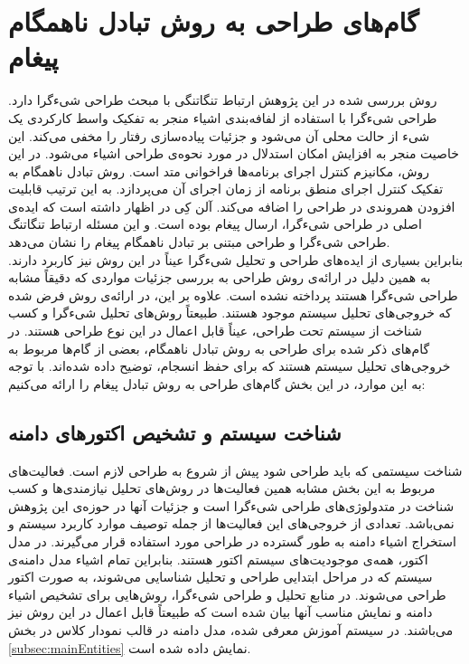 
\section{گام‌های طراحی به روش تبادل ناهمگام پیغام }
\label{section:design_steps}
روش بررسی شده در این پژوهش ارتباط تنگاتنگی با مبحث طراحی شیءگرا دارد. طراحی شیءگرا با استفاده از لفافه‌بندی اشیاء منجر به تفکیک واسط کارکردی یک شیء از حالت محلی آن می‌شود و جزئیات پیاده‌سازی رفتار را مخفی ‌می‌کند. این خاصیت منجر به افزایش امکان استدلال در مورد نحوه‌ی طراحی اشیاء می‌شود. در این روش، مکانیزم کنترل اجرای برنامه‌ها فراخوانی متد است. روش تبادل ناهمگام به تفکیک کنترل اجرای منطق برنامه از زمان اجرای آن می‌پردازد. به این ترتیب قابلیت افزودن همروندی در طراحی را اضافه می‌کند. آلن کِی در \cite{Kay_messaging} اظهار داشته است که ایده‌ی اصلی در طراحی شیءگرا، ارسال پیغام بوده است. و این مسئله ارتباط تنگاتنگ طراحی شیءگرا و طراحی مبتنی بر تبادل ناهمگام پیغام را نشان می‌دهد.\\
بنابراین بسیاری از ایده‌های طراحی و تحلیل شیءگرا عیناً در این روش نیز کاربرد دارند. به همین دلیل در ارائه‌ی روش طراحی به بررسی جزئیات مواردی که دقیقاً مشابه طراحی شیءگرا هستند پرداخته نشده است. علاوه بر این، در ارائه‌ی روش فرض شده که خروجی‌های تحلیل سیستم موجود هستند. طبیعتاً روش‌های تحلیل شیءگرا و کسب شناخت از سیستم تحت طراحی، عیناً قابل اعمال در این نوع طراحی هستند. در گام‌های ذکر شده برای طراحی به روش تبادل ناهمگام، بعضی از گام‌ها مربوط به خروجی‌های تحلیل سیستم هستند که برای حفظ انسجام، توضیح داده شده‌اند. با توجه به این موارد، در این بخش گام‌های طراحی به روش تبادل پیغام را ارائه می‌کنیم:

\subsection{شناخت سیستم و تشخیص اکتورهای دامنه}
شناخت سیستمی که باید طراحی شود پیش از شروع به طراحی لازم است. فعالیت‌های مربوط به این بخش مشابه همین فعالیت‌ها در روش‌های تحلیل نیازمندی‌ها و کسب شناخت در متدولوژی‌های طراحی شیءگرا است و جزئیات آنها در حوزه‌ی این پژوهش نمی‌باشد. تعدادی از خروجی‌های این فعالیت‌ها از جمله توصیف موارد کاربرد سیستم و استخراج اشیاء دامنه به طور گسترده در طراحی مورد استفاده قرار می‌گیرند.
در مدل اکتور، همه‌ی موجودیت‌های سیستم اکتور هستند. بنابراین تمام اشیاء مدل دامنه‌ی سیستم که در مراحل ابتدایی طراحی و تحلیل شناسایی می‌شوند، به صورت اکتور طراحی می‌شوند. در منابع تحلیل و طراحی شیءگرا، روش‌هایی برای تشخیص اشیاء دامنه و نمایش مناسب آنها بیان شده است که طبیعتاً قابل اعمال در این روش نیز می‌باشند\cite{Larman_2004}. در سیستم آموزش معرفی شده، مدل دامنه در قالب نمودار کلاس در بخش \ref{subsec:mainEntities} نمایش داده شده است.
